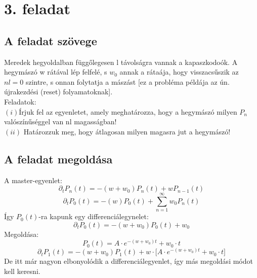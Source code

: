 \documentclass[12pt]{article}
\begin{document}
\newpage
\section*{3. feladat}
\subsection*{A feladat szövege}
Meredek hegyoldalban függőlegesen l távolságra vannak a kapaszkodoók. A hegymászó w rátával lép felfelé, s $w_0$ annak a rátaája, hogy visszacsűszik az $nl = 0$ szintre, s onnan folytatja a mászást [ez a probléma példája az ún. újrakezdési (reset) folyamatoknak].
\\Feladatok:\\
$(i)$Írjuk fel az egyenletet, amely meghatározza, hogy a hegymászó milyen $P_n$ valószínűséggel van nl magasságban!\\
$(ii)$ Határozzuk meg, hogy átlagosan milyen magasra jut a hegymászó!
\subsection*{A feladat megoldása}
A master-egyenlet:
$$ \partial_tP_n(t) = -(w+w_0)P_n(t) + wP_{n-1}(t) $$
$$\partial_tP_0(t ) = -(w)P_0(t) + \sum^\infty_{n = 1}w_0P_n(t)$$
Így $P_0(t)$-ra kapunk egy differenciálegynelet:
$$\partial_tP_0(t) = -(w+w_0)P_0(t) + w_0$$
Megoldása:
$$P_0(t) = A\cdot e^{-(w+w_0)t} + w_0\cdot t$$
$$\partial_t P_1(t) =-(w+w_0)P_{1}(t) +w\cdot \Big[A\cdot e^{-(w+w_0)t} + w_0\cdot t\Big ] $$
De itt már nagyon elbonyolódik a differenciálegyenlet, így más megoldási módot kell keresni.
\end{document}
